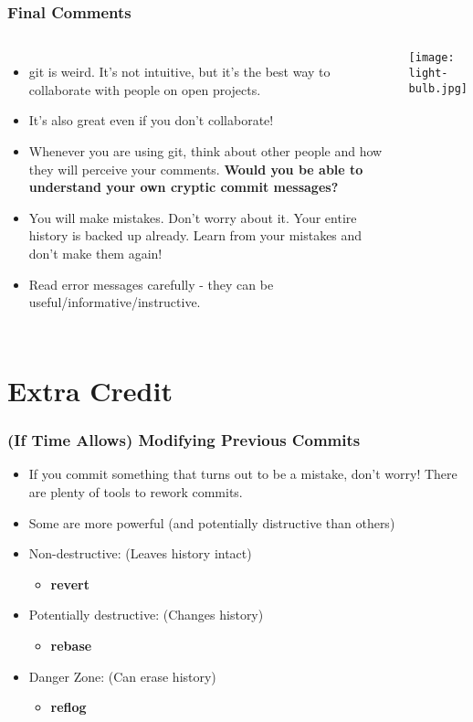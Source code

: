 \documentclass{beamer}
\begin{document}
\begin{frame}
\frametitle{Final Comments}
\begin{columns}
\begin{itemize}
\item git is weird. It's not intuitive, but it's the best way to collaborate with people on open projects.
\item It's also great even if you don't collaborate!
\item Whenever you are using git, think about other people and how they will perceive your comments. \textbf{Would you be able to understand your own cryptic commit messages?}
\item You will make mistakes. Don't worry about it. Your entire history is backed up already. Learn from your mistakes and don't make them again!
\item Read error messages carefully - they can be useful/informative/instructive.
\end{itemize}
\texttt{[image: light-bulb.jpg]}
\end{columns}
\end{frame}

\section{Extra Credit}

\begin{frame}
\frametitle{(If Time Allows) Modifying Previous Commits}
\begin{itemize}
\item If you commit something that turns out to be a mistake, don't worry! There are plenty of tools to rework commits.
\item Some are more powerful (and potentially distructive than others)
\item Non-destructive: (Leaves history intact)
	\begin{itemize}
	\item \textbf{revert}
	\end{itemize}
\item Potentially destructive: (Changes history)
	\begin{itemize}
	\item \textbf{rebase}
	\end{itemize}
\item Danger Zone: (Can erase history)
	\begin{itemize}
	\item \textbf{reflog}
	\end{itemize}
\end{itemize}
\end{frame}
\end{document}
